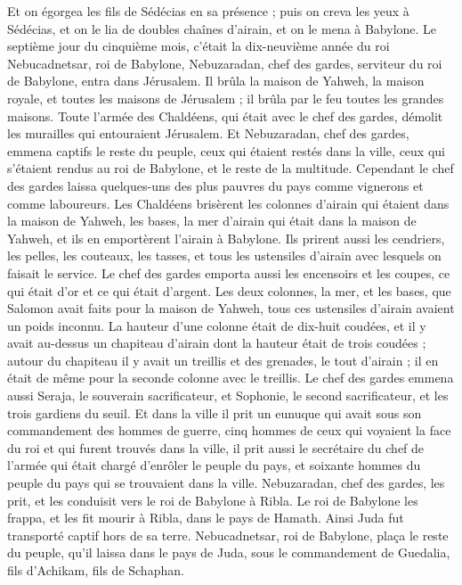\begin{multicols}{2}
Et on égorgea les fils de Sédécias en sa présence ; puis on creva les yeux à Sédécias, et on le lia de doubles chaînes d’airain, et on le mena à Babylone.
Le septième jour du cinquième mois, c’était la dix-neuvième année du roi Nebucadnetsar, roi de Babylone, Nebuzaradan, chef des gardes, serviteur du roi de Babylone,\FTNT{} entra dans Jérusalem.
Il brûla la maison de Yahweh, la maison royale, et toutes les maisons de Jérusalem ; il brûla par le feu toutes les grandes maisons.
Toute l’armée des Chaldéens, qui était avec le chef des gardes, démolit les murailles qui entouraient Jérusalem.
Et Nebuzaradan, chef des gardes, emmena captifs le reste du peuple, ceux qui étaient restés dans la ville, ceux qui s’étaient rendus au roi de Babylone, et le reste de la multitude.
Cependant le chef des gardes laissa quelques-uns des plus pauvres du pays comme vignerons et comme laboureurs.
Les Chaldéens brisèrent les colonnes d’airain qui étaient dans la maison de Yahweh, les bases, la mer d’airain qui était dans la maison de Yahweh, et ils en emportèrent l’airain à Babylone.
Ils prirent aussi les cendriers, les pelles, les couteaux, les tasses, et tous les ustensiles d’airain avec lesquels on faisait le service.
Le chef des gardes emporta aussi les encensoirs et les coupes, ce qui était d’or et ce qui était d’argent.
Les deux colonnes, la mer, et les bases, que Salomon avait faits pour la maison de Yahweh, tous ces ustensiles d’airain avaient un poids inconnu.
La hauteur d’une colonne était de dix-huit coudées, et il y avait au-dessus un chapiteau d’airain dont la hauteur était de trois coudées ; autour du chapiteau il y avait un treillis et des grenades, le tout d’airain ; il en était de même pour la seconde colonne avec le treillis.
Le chef des gardes emmena aussi Seraja, le souverain sacrificateur, et Sophonie, le second sacrificateur, et les trois gardiens du seuil.
Et dans la ville il prit un eunuque qui avait sous son commandement des hommes de guerre, cinq hommes de ceux qui voyaient la face du roi et qui furent trouvés dans la ville, il prit aussi le secrétaire du chef de l’armée qui était chargé d’enrôler le peuple du pays, et soixante hommes du peuple du pays qui se trouvaient dans la ville.
Nebuzaradan, chef des gardes, les prit, et les conduisit vers le roi de Babylone à Ribla.
Le roi de Babylone les frappa, et les fit mourir à Ribla, dans le pays de Hamath. Ainsi Juda fut transporté captif hors de sa terre.
Nebucadnetsar, roi de Babylone, plaça le reste du peuple, qu’il laissa dans le pays de Juda, sous le commandement de Guedalia, fils d’Achikam, fils de Schaphan.

\end{multicols}
